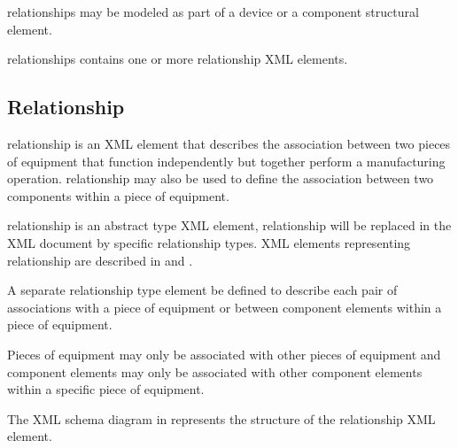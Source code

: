 \gls{relationships} may be modeled as part of a \gls{device} or a \gls{component} \gls{structural element}.
 
\gls{relationships} contains one or more \gls{relationship} XML elements.




\subsection{Relationship}
\label{sec:Relationship}

\gls{relationship} is an XML element that describes the association between two pieces of equipment that function independently but together perform a manufacturing operation. \gls{relationship} may also be used to define the association between two components within a piece of equipment.

\gls{relationship} is an abstract type XML element, \gls{relationship} will be replaced in the XML document by specific \gls{relationship} types.  XML elements representing \gls{relationship} are described in  and .

A separate \gls{relationship} type element \MAY be defined to describe each pair of associations with a piece of equipment or between \gls{component} elements within a piece of equipment.

\newpage

Pieces of equipment may only be associated with other pieces of equipment and \gls{component} elements may only be associated with other \gls{component} elements within a specific piece of equipment.



The XML schema diagram in  represents the structure of the \gls{relationship} XML element.

